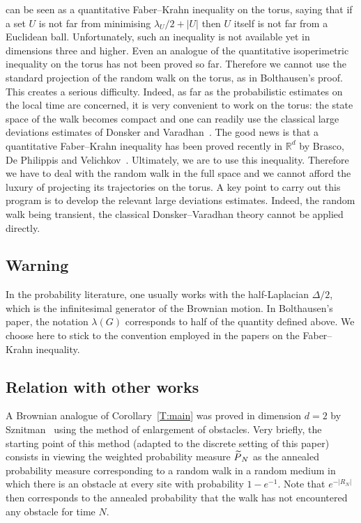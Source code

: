 \documentclass[10pt]{amsart}
\theoremstyle{definition}\newtheorem{defi}[theo]{Definition}\newtheorem{rema}[theo]{Remark}\newtheorem{exam}[theo]{Example}\newtheorem{exem}[theo]{Example}\newtheorem{nota}[theo]{Notation}
\newcommand*\Rd {{\mathbb R^d}}
\let\oldtilde\tilde
\renewcommand*{\tilde}[1]{\mathchoice{\widetilde{#1}}{\widetilde{#1}}{\oldtilde{#1}}{\oldtilde{#1}}}\let\oldhat\hat
\renewcommand*{\hat}[1]{\mathchoice{\widehat{#1}}{\widehat{#1}}{\oldhat{#1}}{\oldhat{#1}}}\let\oldexists\exists
\renewcommand*{\exists}{\mathrel{\oldexists}}
\begin{document}
\cite[Lemma~3.1]{BO} can be seen as a quantitative Faber--Krahn inequality on the torus, saying that if a set $U$ is not far from minimising $\lambda_U/2 + |U|$ then $U$ itself is not far from a Euclidean ball. Unfortunately, such an inequality is not available yet in dimensions three and higher. Even an analogue of the quantitative isoperimetric inequality on the torus has not been proved so far. Therefore we cannot use the standard projection of the random walk on the torus, as in Bolthausen's proof. This creates a serious difficulty. Indeed, as far as the probabilistic estimates on the local time are concerned, it is very convenient to work on the torus: the state space of the walk becomes compact and one can readily use the classical large deviations estimates of Donsker and Varadhan~\cite{DV1}. The good news is that a quantitative Faber--Krahn inequality has been proved recently in $\Rd$ by Brasco, De Philippis and Velichkov~\cite{BLGV}. Ultimately, we are to use this inequality. Therefore we have to deal with the random walk in the full space and we cannot afford the luxury of projecting its trajectories on the torus. A key point to carry out this program is to develop the relevant large deviations estimates. Indeed, the random walk being transient, the classical Donsker--Varadhan theory cannot be applied directly.

\subsection*{Warning}
In the probability literature, one usually works with the half-Laplacian $\Delta/2$, which is the infinitesimal generator of the Brownian motion. In Bolthausen's paper, the notation $\lambda(G)$ corresponds to half of the quantity defined above. We choose here to stick to the convention employed in the papers on the Faber--Krahn inequality.



\subsection{Relation with other works}


A Brownian analogue of Corollary~\ref{T:main} was proved in dimension $d=2$ by Sznitman~\cite{Sznitman} using the method of enlargement of obstacles. Very briefly, the starting point of this method (adapted to the discrete setting of this paper) consists in viewing the weighted probability measure $\tilde P_N$ as the annealed probability measure corresponding to a random walk in a random medium in which there is an obstacle at every site with probability $1-e^{-1}$. Note that $e^{- |R_N|}$ then corresponds to the annealed probability that the walk has not encountered any obstacle for time $N$.
\end{document}
